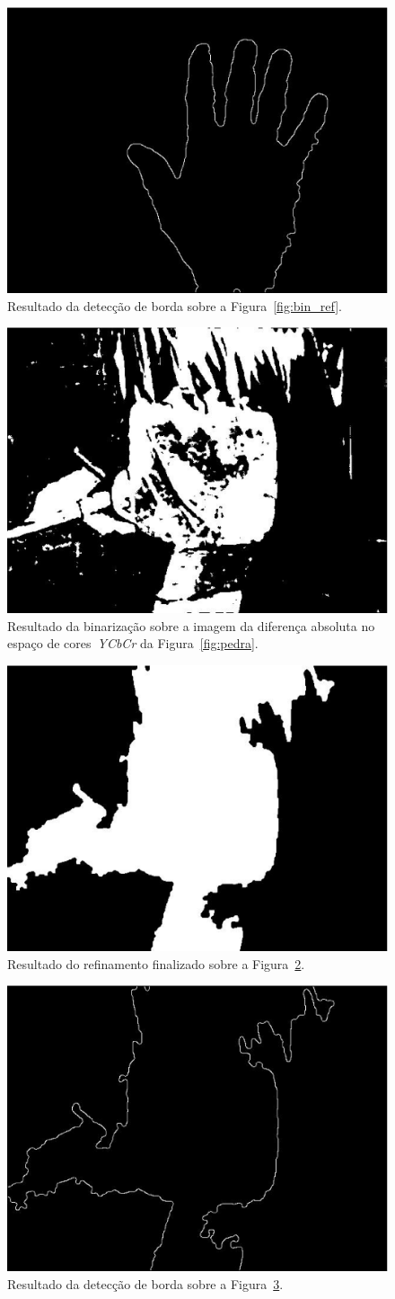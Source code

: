 \documentclass[conference]{Trabalho_Final}
\begin{document}
\begin{figure}[]
  \centering
  \includegraphics[width = 5 cm]{canny}
  \caption{Resultado da detec\c{c}\~ao de borda sobre a Figura~\ref{fig:bin_ref}.}
  \label{fig:canny}
\end{figure}


\begin{figure}[]
  \centering
  \includegraphics[width = 5 cm]{bin_dif_ycbcr2}
  \caption{Resultado da binariza\c{c}\~ao sobre a imagem da diferen\c{c}a absoluta no espa\c{c}o de cores~\textit{YCbCr} da Figura~\ref{fig:pedra}.}
  \label{fig:bin_dif_ycbcr2}
\end{figure}

\begin{figure}[]
  \centering
  \includegraphics[width = 5 cm]{bin_ref2}
  \caption{Resultado do refinamento finalizado sobre a Figura~\ref{fig:bin_dif_ycbcr2}.}
  \label{fig:bin_ref2}
\end{figure}

\begin{figure}[]
  \centering
  \includegraphics[width = 5 cm]{canny2}
  \caption{Resultado da detec\c{c}\~ao de borda sobre a Figura~\ref{fig:bin_ref2}.}
  \label{fig:canny2}
\end{figure}
\end{document}
